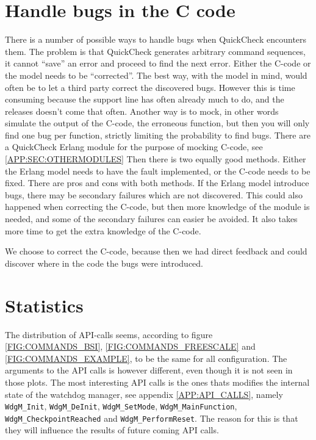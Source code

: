 \section{Handle bugs in the C code}
\label{sec:handlebugs}
There is a number of possible ways to handle bugs when QuickCheck encounters
them. The problem is that QuickCheck generates arbitrary command sequences, it
cannot ``save'' an error and proceed to find the next error. Either the C-code
or the model needs to be ``corrected''.
The best way, with the model in mind, would often be to let a third
party correct the discovered bugs. However this is time consuming because the
support line has often already much to do, and the releases doesn't come that
often.
Another way is to mock, in other words simulate the output of the C-code, the
erroneous function, but then you will only find one
bug per function, strictly limiting the probability to find bugs. There are a
QuickCheck Erlang module for the purpose of mocking C-code, see \ref{APP:SEC:OTHERMODULES}
Then there is two equally good methods. Either the Erlang model needs to have
the fault implemented, or the C-code needs to be fixed. There are pros and cons
with both methods. If the Erlang model introduce bugs, there may be secondary
failures which are not discovered. This could also happened when correcting the
C-code, but then more knowledge of the module is needed, and some of the
secondary failures can easier be avoided. It also takes more time to get the
extra knowledge of the C-code.

We choose to correct the C-code, because then we had direct feedback and could
discover where in the code the bugs were introduced.

\section{Statistics}
The distribution of API-calls seems, according to figure
\ref{FIG:COMMANDS_BSI}, \ref{FIG:COMMANDS_FREESCALE} and
\ref{FIG:COMMANDS_EXAMPLE}, to be the same for all configuration. The arguments
to the API calls is however different, even though it is not seen in those plots.
The most interesting API calls is the ones thats modifies the internal state of
the watchdog manager, see appendix \ref{APP:API_CALLS}, namely \lstinline!WdgM_Init!,
\lstinline!WdgM_DeInit!, \lstinline!WdgM_SetMode!, \lstinline!WdgM_MainFunction!,
\lstinline!WdgM_CheckpointReached! and \lstinline!WdgM_PerformReset!. The reason
for this is that they will influence the results of future coming API calls.

